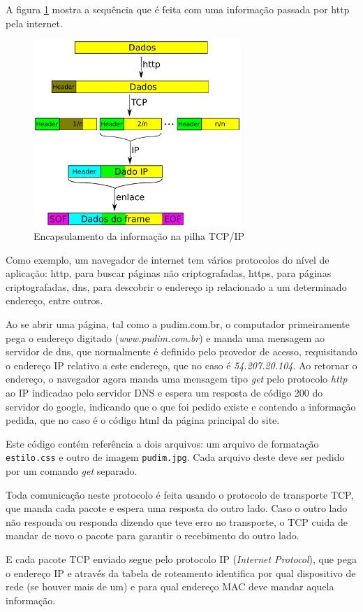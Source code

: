 	A figura \ref{fig:tcp-ip} mostra a sequência que é feita com uma informação passada por http pela internet.
	\begin{figure}[hbt]
		\begin{center}
			\includegraphics[width=0.7\textwidth]{figuras/tcp-ip}
%		   
			\caption{Encapsulamento da informação na pilha TCP/IP}
			\label{fig:tcp-ip}
		\end{center}
	\end{figure}

Como exemplo, um navegador de internet tem vários protocolos do nível de aplicação: http, para buscar páginas não criptografadas, https, para páginas criptografadas, dns, para descobrir o endereço ip relacionado a um determinado endereço, entre outros.

Ao se abrir uma página, tal como a pudim.com.br, o computador primeiramente pega o endereço digitado (\emph{www.pudim.com.br}) e manda uma mensagem ao servidor de dns, que normalmente é definido pelo provedor de acesso, requisitando o endereço IP relativo a este endereço, que no caso é \emph{54.207.20.104}. Ao retornar o endereço, o navegador agora manda uma mensagem tipo \emph{get} pelo protocolo \emph{http} ao IP indicadao pelo servidor DNS e espera um resposta de código 200 do servidor do google, indicando que o que foi pedido existe e contendo a informação pedida, que no caso é o código html da página principal do site.

Este código contém referência a dois arquivos: um arquivo de formatação \verb|estilo.css| e outro de imagem \verb|pudim.jpg|. Cada arquivo deste deve ser pedido por um comando \emph{get} separado.

Toda comunicação neste protocolo é feita usando o protocolo de transporte TCP, que manda cada pacote e espera uma resposta do outro lado. Caso o outro lado não responda ou responda dizendo que teve erro no transporte, o TCP cuida de mandar de novo o pacote para garantir o recebimento do outro lado.

E cada pacote TCP enviado segue pelo protocolo IP (\emph{Internet Protocol}), que pega o endereço IP e através da tabela de roteamento identifica por qual dispositivo de rede (se houver mais de um) e para qual endereço MAC deve mandar aquela informação.